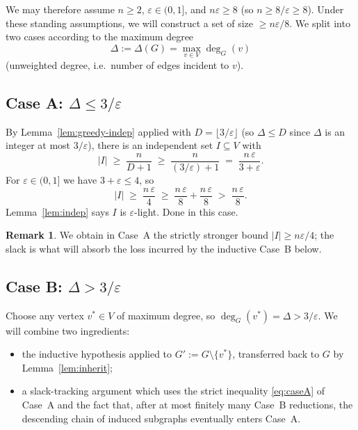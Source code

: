 \documentclass[12pt]{article}
\theoremstyle{definition}
\newtheorem{remark}[theorem]{Remark}
\begin{document}
\medskip

We may therefore assume $n\ge 2$, $\varepsilon\in(0,1]$, and $n\varepsilon\ge 8$ (so $n\ge 8/\varepsilon\ge 8$).  Under these standing assumptions, we will construct a set of size $\ge n\varepsilon/8$.  We split into two cases according to the maximum degree
\[
\Delta := \Delta(G) = \max_{v\in V}\deg_G(v)
\]
(unweighted degree, i.e.\ number of edges incident to $v$).

\subsection{Case A:  $\Delta \le 3/\varepsilon$}

By Lemma~\ref{lem:greedy-indep} applied with $D=\lfloor 3/\varepsilon\rfloor$ (so $\Delta\le D$ since $\Delta$ is an integer at most $3/\varepsilon$), there is an independent set $I\subseteq V$ with
\[
|I| \;\ge\; \frac{n}{D+1} \;\ge\; \frac{n}{(3/\varepsilon)+1} \;=\; \frac{n\,\varepsilon}{3+\varepsilon}.
\]
For $\varepsilon\in(0,1]$ we have $3+\varepsilon\le 4$, so
\begin{equation}\label{eq:caseA}
|I| \;\ge\; \frac{n\,\varepsilon}{4} \;\ge\; \frac{n\,\varepsilon}{8} + \frac{n\,\varepsilon}{8} \;>\; \frac{n\,\varepsilon}{8}.
\end{equation}
Lemma~\ref{lem:indep} says $I$ is $\varepsilon$-light.  Done in this case.

\begin{remark}
We obtain in Case~A the strictly stronger bound $|I|\ge n\varepsilon/4$; the slack is what will absorb the loss incurred by the inductive Case~B below.
\end{remark}

\subsection{Case B:  $\Delta > 3/\varepsilon$}

Choose any vertex $v^*\in V$ of maximum degree, so $\deg_G(v^*)=\Delta>3/\varepsilon$.  We will combine two ingredients:

\begin{itemize}
\item[(i)] the inductive hypothesis applied to $G' := G\setminus\{v^*\}$, transferred back to $G$ by Lemma~\ref{lem:inherit};
\item[(ii)] a slack-tracking argument which uses the strict inequality \eqref{eq:caseA} of Case~A and the fact that, after at most finitely many Case~B reductions, the descending chain of induced subgraphs eventually enters Case~A.
\end{itemize}
\end{document}
